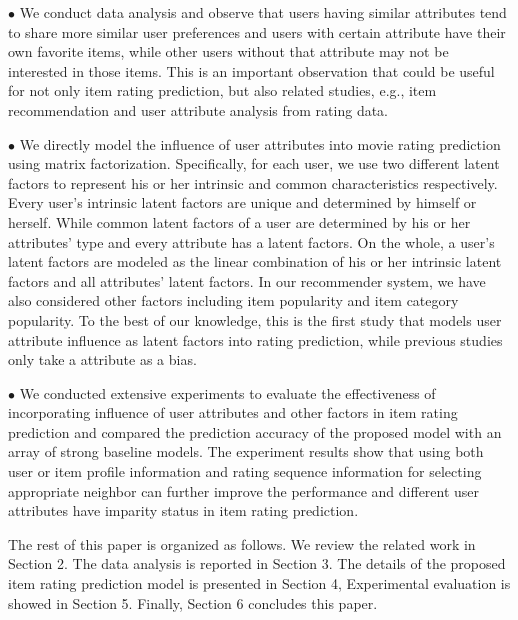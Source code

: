 \documentclass{llncs}
\begin{document}
	\begin{adjustwidth}{0.5cm}{0cm}
		$\bullet$ We conduct data analysis and observe that users having similar attributes tend to share more similar user
		preferences and users with certain attribute have their own favorite items, while other users without that attribute may not be interested in
		those items. This is an important observation that
		could be useful for not only item rating prediction, but
		also related studies, e.g., item recommendation and user attribute
		analysis from rating data.
	\end{adjustwidth}
	\begin{adjustwidth}{0.5cm}{0cm}
		$\bullet$ We directly model the influence of user attributes into movie rating prediction using matrix factorization.
		Specifically, for each user, we use two different latent factors to represent his or her intrinsic and common characteristics respectively.
		Every user's intrinsic latent factors are unique and determined by himself or herself. While common latent factors of a user are determined by
		his or her attributes' type and every attribute has a latent factors.
		On the whole, a user's latent factors are modeled as the linear combination of his or her intrinsic latent factors and all attributes' latent factors.
		In our recommender system, we have also considered other factors including item popularity and item category popularity.
		To the best of our knowledge, this is the first
		study that models user attribute influence as latent factors into rating prediction, while previous studies only take a attribute as a bias.
	\end{adjustwidth}
	\begin{adjustwidth}{0.5cm}{0cm}
		$\bullet$ We conducted extensive experiments to evaluate the effectiveness of incorporating influence of user attributes and other factors in
		item rating prediction and compared the prediction accuracy of the proposed model with an
		array of strong baseline models. The experiment results show  that using both user or item profile information and rating sequence information
		for selecting appropriate neighbor can further improve the performance and different user attributes have imparity
		status in item rating prediction.
		
	\end{adjustwidth}
	
	
	
	The rest of this paper is organized as follows. We review the
	related work
	in Section 2. The data analysis is reported in Section 3.
	The details of the proposed item rating prediction model
	is presented in Section 4, Experimental evaluation is showed in Section 5.
	Finally, Section 6 concludes this paper.
	
\end{document}
